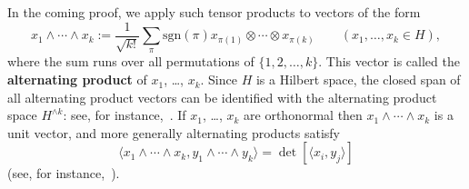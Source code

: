 \documentclass[12pt,a4paper]{article}
\numberwithin{equation}{section}
\theoremstyle{remark}
\renewcommand{\rm}[1]{\mathrm{#1}}
\begin{document}
In the coming proof, we apply such tensor products to vectors of the form
\begin{equation}\label{eq:wedge}
x_1\wedge \cdots \wedge x_k := \frac{1}{\sqrt{k!}}\sum_{\pi}\rm{sgn}(\pi)x_{\pi(1)}\otimes \cdots \otimes x_{\pi(k)} \qquad (x_1,\dots,x_k \in H),
\end{equation}
where the sum runs over all permutations of $\{1,2,\dots,k\}$. This vector is called the \textbf{alternating product} of $x_1$, \dots, $x_k$.  Since $H$ is a Hilbert space, the closed span of all alternating product vectors can be identified with the alternating product space $H^{\wedge k}$: see, for instance,~\cite[Sec. 1.5]{SimTIA}.  If $x_1$, \dots, $x_k$ are orthonormal then $x_1\wedge \cdots \wedge x_k$ is a unit vector, and more generally alternating products satisfy
\begin{equation}\label{eq:alt-det-form}
\langle x_1\wedge \cdots \wedge x_k,y_1\wedge \cdots \wedge y_k\rangle = \det[\langle x_i,y_j\rangle]
\end{equation}
(see, for instance,~\cite[equation (1.10)]{SimTIA}).
\end{document}

